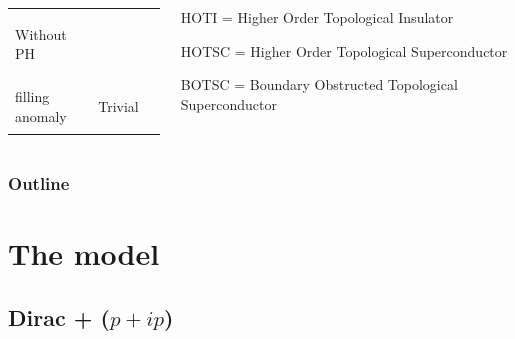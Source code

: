\documentclass{beamer}
\renewcommand{\(}{\left(}
\renewcommand{\)}{\right)}
\renewcommand{\[}{\left[}
\renewcommand{\]}{\right]}
\begin{document}
\begin{frame}
\begin{columns}
\begin{column}{0.5\textwidth}
\begin{table}
\begin{adjustbox}{width=\columnwidth,center}
\begin{tabular}{|| p{2.5cm}| p{2.5cm} | p{2.5cm}||}
                        \\ 
                        \hline
                        \begin{center}
                        Without PH
                        \end{center} &
                        \begin{center}
                        HOTI$_{2}$; \\
                        filling anomaly
                        \end{center}
                        & 
                        \begin{center}
                        Trivial
                        \end{center}
                            \\ 
                        \hline
                        \end{tabular}
                \end{adjustbox}
            \end{table}
        \end{column}
        \begin{column}{0.5\textwidth}
            HOTI = Higher Order Topological Insulator

            HOTSC = Higher Order Topological Superconductor

            BOTSC = Boundary Obstructed Topological Superconductor
        \end{column}
    \end{columns}

\end{frame}

\begin{frame}
    \frametitle{Outline}
    \tableofcontents
\end{frame}


\section{The model}
\subsection{Dirac + \texorpdfstring{($p+ip$)}{}}
\end{document}
